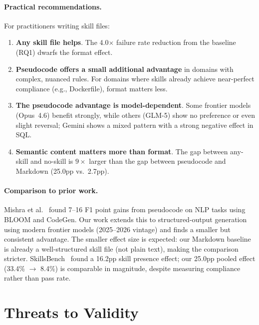\documentclass[sigconf,nonacm]{acmart}
\begin{document}
\paragraph{Practical recommendations.}
For practitioners writing skill files:
\begin{enumerate}
  \item \textbf{Any skill file helps}. The 4.0$\times$ failure rate reduction
    from the baseline (RQ1) dwarfs the format effect.
  \item \textbf{Pseudocode offers a small additional advantage} in domains
    with complex, nuanced rules. For domains where skills already achieve
    near-perfect compliance (e.g., Dockerfile), format matters less.
  \item \textbf{The pseudocode advantage is model-dependent}.
    Some frontier models (Opus~4.6) benefit strongly, while others
    (GLM-5) show no preference or even slight reversal; Gemini shows
    a mixed pattern with a strong negative effect in SQL.
  \item \textbf{Semantic content matters more than format}. The gap between
    any-skill and no-skill is $9\times$ larger than the gap between
    pseudocode and Markdown (25.0pp vs.\ 2.7pp).
\end{enumerate}

\paragraph{Comparison to prior work.}
Mishra et al.~\cite{mishra2023prompting} found 7--16 F1 point gains from
pseudocode on NLP tasks using BLOOM and CodeGen. Our work extends this to
structured-output generation using modern frontier models (2025--2026 vintage)
and finds a smaller but consistent advantage. The smaller effect size is
expected: our Markdown baseline is already a well-structured skill file (not
plain text), making the comparison stricter. SkillsBench~\cite{li2026skillsbench}
found a 16.2pp skill presence effect; our 25.0pp pooled effect
(33.4\% $\to$ 8.4\%) is comparable in magnitude, despite measuring
compliance rather than pass rate.



\section{Threats to Validity}\label{sec:threats}
\end{document}
